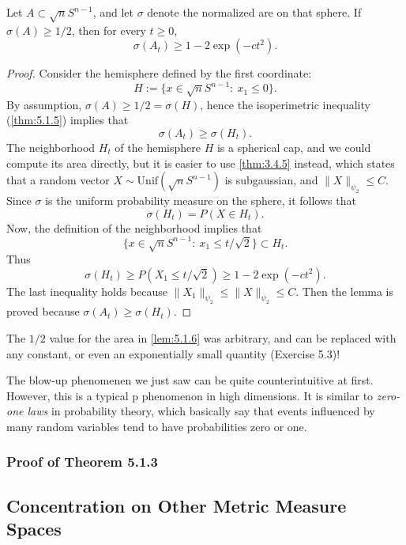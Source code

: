 \begin{lemma}[Blow-up]
\label{lem:5.1.6}
Let $A \subset \sqrt{n}S^{n - 1}$, and let $\sigma$ denote the normalized are on that sphere. If 
$\sigma(A) \geq 1/2$, then for every $t \geq 0$, 
\[ \sigma(A_t) \geq 1 - 2 \exp{(-ct^2)}. \]
\end{lemma}

\begin{proof}
Consider the hemisphere defined by the first coordinate:
\[ H := \{x \in \sqrt{n}S^{n - 1}: \ x_1 \leq 0 \}. \]
By assumption, $\sigma(A) \geq 1/2 = \sigma(H)$, hence the isoperimetric inequality (\cref{thm:5.1.5}) implies 
that 
\[ \sigma(A_t) \geq \sigma(H_t). \]
The neighborhood $H_t$ of the hemisphere $H$ is a spherical cap, and we could compute its area directly, but 
it is easier to use \cref{thm:3.4.5} instead, which states that a random vector $X \sim \mathrm{Unif}
(\sqrt{n}S^{n - 1})$ is subgaussian, and $\lVert X \rVert_{\psi_2} \leq C$. Since $\sigma$ is the uniform 
probability measure on the sphere, it follows that 
\[ \sigma(H_t) = P(X \in H_t). \]
Now, the definition of the neighborhood implies that 
\[ \{ x \in \sqrt{n}S^{n - 1}: \ x_1 \leq t / \sqrt{2} \} \subset H_t. \]
Thus
\[ \sigma(H_t) \geq P(X_1 \leq t / \sqrt{2}) \geq 1 - 2 \exp{(-ct^2)}. \]
The last inequality holds because $\lVert X_1 \rVert_{\psi_2} \leq \lVert X \rVert_{\psi_2} \leq C$. Then the 
lemma is proved because $\sigma(A_t) \geq \sigma(H_t)$.
\end{proof}

\begin{remark}
\label{rmk:5.1.7}
The $1/2$ value for the area in \cref{lem:5.1.6} was arbitrary, and can be replaced with any constant, or even 
an exponentially small quantity (Exercise 5.3)!
\end{remark}

\begin{remark}
\label{rmk:5.1.8}
The blow-up phenomenen we just saw can be quite counterintuitive at first. However, this is a typical p
phenomenon in high dimensions. It is similar to \textit{zero-one laws} in probability theory, which basically 
say that events influenced by many random variables tend to have probabilities zero or one.
\end{remark}


\subsubsection{Proof of Theorem 5.1.3}




\subsection{Concentration on Other Metric Measure Spaces}

